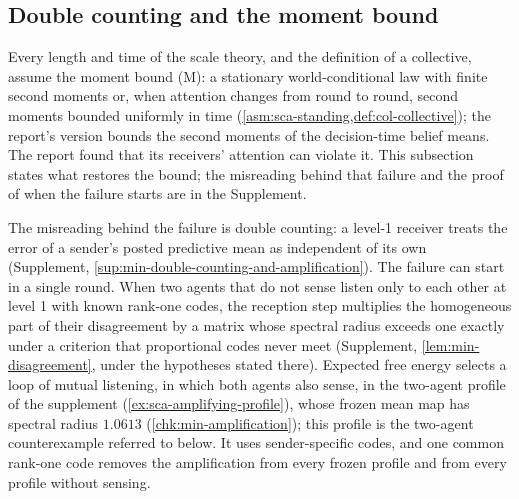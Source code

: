 \subsection{Double counting and the moment bound}\label{sec:min-moment}

Every length and time of the scale theory, and the definition of a collective, assume the moment bound (M): a stationary world-conditional law with finite second moments or, when attention changes from round to round, second moments bounded uniformly in time (\cref{asm:sca-standing,def:col-collective}); the report's version bounds the second moments of the decision-time belief means. The report found that its receivers' attention can violate it. This subsection states what restores the bound; the misreading behind that failure and the proof of when the failure starts are in the Supplement.

The misreading behind the failure is double counting: a level-1 receiver treats the error of a sender's posted predictive mean as independent of its own (Supplement, \cref{sup:min-double-counting-and-amplification}). The failure can start in a single round. When two agents that do not sense listen only to each other at level 1 with known rank-one codes, the reception step multiplies the homogeneous part of their disagreement by a matrix whose spectral radius exceeds one exactly under a criterion that proportional codes never meet (Supplement, \cref{lem:min-disagreement}, under the hypotheses stated there). Expected free energy selects a loop of mutual listening, in which both agents also sense, in the two-agent profile of the supplement (\cref{ex:sca-amplifying-profile}), whose frozen mean map has spectral radius $1.0613$ (\cref{chk:min-amplification}); this profile is the two-agent counterexample referred to below. It uses sender-specific codes, and one common rank-one code removes the amplification from every frozen profile and from every profile without sensing.

